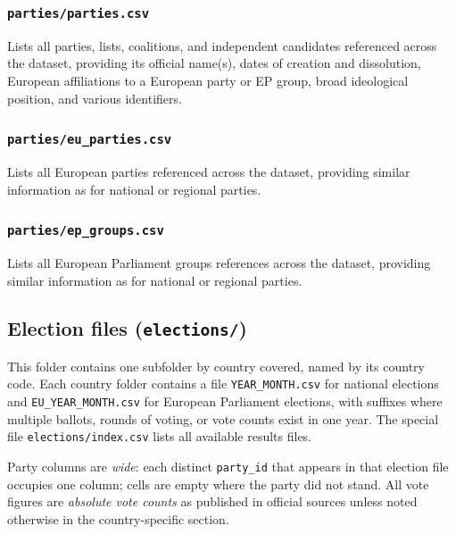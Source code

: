 \subsubsection{\texttt{parties/parties.csv}}

Lists all parties, lists, coalitions, and independent candidates referenced across the dataset,
providing its official name(s), dates of creation and dissolution, European
affiliations to a European party or EP group, broad ideological position,
and various identifiers.

\subsubsection{\texttt{parties/eu\_parties.csv}}

Lists all European parties referenced across the dataset, providing similar information
as for national or regional parties.

\subsubsection{\texttt{parties/ep\_groups.csv}}

Lists all European Parliament groups references across the dataset, providing similar
information as for national or regional parties.

\subsection{Election files (\texttt{elections/})}

This folder contains one subfolder by country covered, named by its country
code. Each country folder contains a file
\texttt{YEAR\_MONTH.csv} for national elections and \texttt{EU\_YEAR\_MONTH.csv} for
European Parliament elections, with suffixes where multiple ballots, rounds of voting,
or vote counts exist in one year.
The special file \texttt{elections/index.csv} lists all available results files.

Party columns are \textit{wide}: each distinct \texttt{party\_id} that
appears in that election file occupies one column; cells are empty where the
party did not stand.
All vote figures are \textit{absolute vote counts} as published in official
sources unless noted otherwise in the country-specific section.
